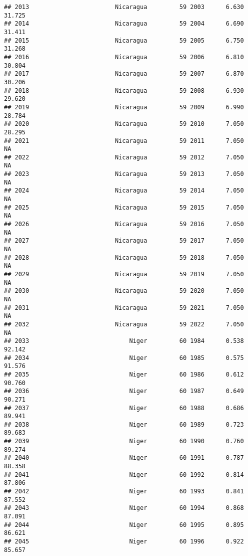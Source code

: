 \documentclass[
]{article}
\begin{document}
\begin{verbatim}
## 2013                        Nicaragua         59 2003      6.630     31.725
## 2014                        Nicaragua         59 2004      6.690     31.411
## 2015                        Nicaragua         59 2005      6.750     31.268
## 2016                        Nicaragua         59 2006      6.810     30.804
## 2017                        Nicaragua         59 2007      6.870     30.206
## 2018                        Nicaragua         59 2008      6.930     29.620
## 2019                        Nicaragua         59 2009      6.990     28.784
## 2020                        Nicaragua         59 2010      7.050     28.295
## 2021                        Nicaragua         59 2011      7.050         NA
## 2022                        Nicaragua         59 2012      7.050         NA
## 2023                        Nicaragua         59 2013      7.050         NA
## 2024                        Nicaragua         59 2014      7.050         NA
## 2025                        Nicaragua         59 2015      7.050         NA
## 2026                        Nicaragua         59 2016      7.050         NA
## 2027                        Nicaragua         59 2017      7.050         NA
## 2028                        Nicaragua         59 2018      7.050         NA
## 2029                        Nicaragua         59 2019      7.050         NA
## 2030                        Nicaragua         59 2020      7.050         NA
## 2031                        Nicaragua         59 2021      7.050         NA
## 2032                        Nicaragua         59 2022      7.050         NA
## 2033                            Niger         60 1984      0.538     92.142
## 2034                            Niger         60 1985      0.575     91.576
## 2035                            Niger         60 1986      0.612     90.760
## 2036                            Niger         60 1987      0.649     90.271
## 2037                            Niger         60 1988      0.686     89.941
## 2038                            Niger         60 1989      0.723     89.683
## 2039                            Niger         60 1990      0.760     89.274
## 2040                            Niger         60 1991      0.787     88.358
## 2041                            Niger         60 1992      0.814     87.806
## 2042                            Niger         60 1993      0.841     87.552
## 2043                            Niger         60 1994      0.868     87.091
## 2044                            Niger         60 1995      0.895     86.621
## 2045                            Niger         60 1996      0.922     85.657

\end{verbatim}
\end{document}
